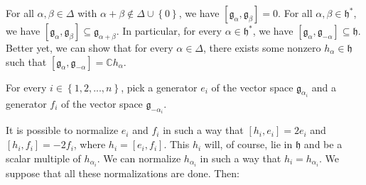 \documentclass[etingof-lie.tex]{subfiles}
\begin{document}
For all $\alpha,\beta\in\Delta$ with $\alpha+\beta\notin\Delta\cup\left\{
0\right\}  $, we have $\left[  \mathfrak{g}_{\alpha},\mathfrak{g}_{\beta
}\right]  =0$. For all $\alpha,\beta\in\mathfrak{h}^{\ast}$, we have $\left[
\mathfrak{g}_{\alpha},\mathfrak{g}_{\beta}\right]  \subseteq\mathfrak{g}%
_{\alpha+\beta}$. In particular, for every $\alpha\in\mathfrak{h}^{\ast}$, we
have $\left[  \mathfrak{g}_{\alpha},\mathfrak{g}_{-\alpha}\right]
\subseteq\mathfrak{h}$. Better yet, we can show that for every $\alpha
\in\Delta$, there exists some nonzero $h_{\alpha}\in\mathfrak{h}$ such that
$\left[  \mathfrak{g}_{\alpha},\mathfrak{g}_{-\alpha}\right]  =\mathbb{C}%
h_{\alpha}$.

For every $i\in\left\{  1,2,...,n\right\}  $, pick a generator $e_{i}$ of the
vector space $\mathfrak{g}_{\alpha_{i}}$ and a generator $f_{i}$ of the vector
space $\mathfrak{g}_{-\alpha_{i}}$.

It is possible to normalize $e_{i}$ and $f_{i}$ in such a way that $\left[
h_{i},e_{i}\right]  =2e_{i}$ and $\left[  h_{i},f_{i}\right]  =-2f_{i}$, where
$h_{i}=\left[  e_{i},f_{i}\right]  $. This $h_{i}$ will, of course, lie in
$\mathfrak{h}$ and be a scalar multiple of $h_{\alpha_{i}}$. We can normalize
$h_{\alpha_{i}}$ in such a way that $h_{i}=h_{\alpha_{i}}$. We suppose that
all these normalizations are done. Then:
\end{document}
